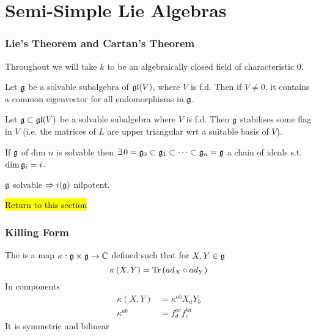 \documentclass{article}
\begin{document}
\part{Semi-Simple Lie Algebras}

\section{Lie's Theorem and Cartan's Theorem}
\begin{notation}
	Throughout we will take $k$ to be an algebraically closed field of characteristic 0. 
\end{notation}

\begin{theorem}
	Let $\mathfrak{g}$ be a solvable subalgebra of $\mathfrak{gl}(V)$, where $V$ is f.d. Then if $V \neq 0$, it contains a common eigenvector for all endomorphisms in $\mathfrak{g}$. 
\end{theorem}
\begin{corollary}
	Let $\mathfrak{g}\subset \mathfrak{gl}(V)$ be a solvable subalgebra where $V$ is f.d. Then $\mathfrak{g}$ stabilises some flag in $V$ (i.e. the matrices of $L$ are upper triangular wrt a suitable basis of $V$). 
\end{corollary}

\begin{corollary}
	If $\mathfrak{g}$ of dim $n$ is solvable then $\exists \,  0 = \mathfrak{g}_0 \subset \mathfrak{g}_1 \subset \dots \subset \mathfrak{g}_n=\mathfrak{g}$ a chain of ideals s.t. $\dim \mathfrak{g}_i = i$. 
\end{corollary}

\begin{corollary}
	$\mathfrak{g}$ solvable $\Rightarrow i(\mathfrak{g})$ nilpotent. 
\end{corollary}

\hl{Return to this section}

\section{Killing Form}
\begin{definition}
	The  is a map $\kappa:\mathfrak{g}\times\mathfrak{g}\to\mathbb{C}$ defined such that for $X,Y\in\mathfrak{g}$
	\[
	\kappa\left(X,Y\right)=\operatorname{Tr}\left(ad_X \circ ad_Y\right)
	\]
	In components 
	\begin{align*}
	\kappa(X,Y) &= \kappa^{ab}X_a Y_b \\
	\kappa^{ab} &= f^{ac}_d f^{bd}_c
	\end{align*}
	It is symmetric and bilinear 
\end{definition}
\end{document}
